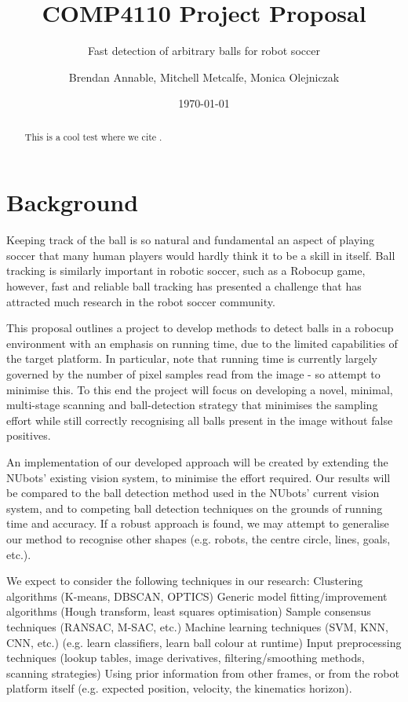 \documentclass[11pt]{scrartcl} %
\title{COMP4110 Project Proposal}
\subtitle{Fast detection of arbitrary balls for robot soccer}
\author{ Brendan Annable, Mitchell Metcalfe, Monica Olejniczak }
\date{\today} %
\begin{document}
\maketitle

\begin{abstract}
    
    This is a cool test where we cite \citep{Yuan2015}.
    
\end{abstract}

\tableofcontents

\section{Background}

Keeping track of the ball is so natural and fundamental an aspect of playing soccer that many human players would hardly think it to be a skill in itself. Ball tracking is similarly important in robotic soccer, such as a Robocup game, however, fast and reliable ball tracking has presented a challenge that has attracted much research in the robot soccer community.

This proposal outlines a project to develop methods to detect balls in a robocup environment with an emphasis on running time, due to the limited capabilities of the target platform.
In particular, note that running time is currently largely governed by the number of pixel samples read from the image - so attempt to minimise this.
To this end the project will focus on developing a novel, minimal, multi-stage scanning and ball-detection strategy that minimises the sampling effort while still correctly recognising all balls present in the image without false positives.

An implementation of our developed approach will be created by extending the NUbots’ existing vision system, to minimise the effort required.
Our results will be compared to the ball detection method used in the NUbots’ current vision system, and to competing ball detection techniques on the grounds of running time and accuracy.
If a robust approach is found, we may attempt to generalise our method to recognise other shapes (e.g. robots, the centre circle, lines, goals, etc.).

We expect to consider the following techniques in our research:
Clustering algorithms (K-means, DBSCAN, OPTICS)
Generic model fitting/improvement algorithms (Hough transform, least squares optimisation)
Sample consensus techniques (RANSAC, M-SAC, etc.)
Machine learning techniques (SVM, KNN, CNN, etc.) (e.g. learn classifiers, learn ball colour at runtime)
Input preprocessing techniques (lookup tables, image derivatives, filtering/smoothing methods, scanning strategies)
Using prior information from other frames, or from the robot platform itself (e.g. expected position, velocity, the kinematics horizon).
\end{document}
